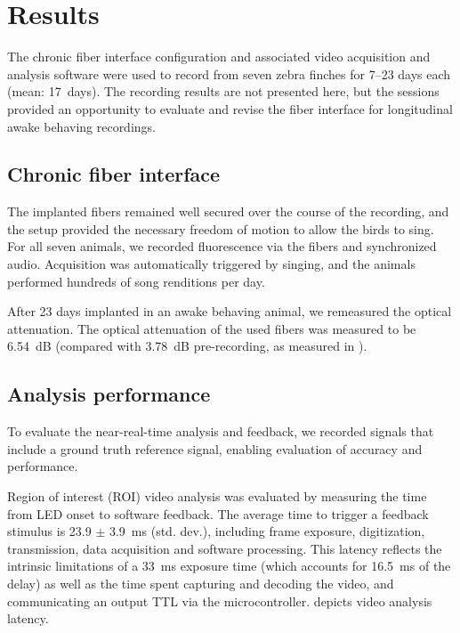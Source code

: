\section{Results}

The chronic fiber interface configuration and associated video 
acquisition and analysis software were used to record 
from seven zebra finches for 7--23 days each (mean: 
17~days). The recording results are not 
presented here, but the sessions provided an opportunity to 
evaluate and revise the fiber interface for longitudinal 
awake behaving recordings.

\subsection{Chronic fiber interface}

The implanted fibers remained well secured over the 
course of the recording, and the setup provided the 
necessary freedom of motion to allow the birds to 
sing. For all seven animals, we recorded fluorescence 
via the fibers and synchronized audio. Acquisition 
was automatically triggered by singing, and the 
animals performed hundreds of song renditions per day.

After 23 days implanted in an awake behaving animal,
we remeasured the optical attenuation. The optical 
attenuation of the used fibers was measured to be 
6.54~dB (compared with 3.78~dB pre-recording, as 
measured in ).

\subsection{Analysis performance}

To evaluate the near-real-time analysis and feedback, we recorded 
signals that include a ground truth reference signal, enabling 
evaluation of accuracy and performance.

Region of interest (ROI) video analysis was evaluated by measuring the
time from LED onset to software feedback. The average time to trigger 
a feedback stimulus is 23.9 $\pm$ 3.9~ms (std. dev.), 
including frame exposure, digitization, transmission, data acquisition 
and software processing. This latency reflects the intrinsic 
limitations of a 33~ms exposure time (which accounts for 16.5~ms of 
the delay) as well as the time spent capturing and decoding the video, 
and communicating an output TTL via the microcontroller. 
 depicts video analysis latency.

